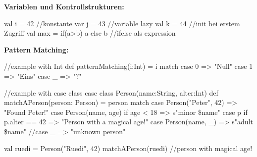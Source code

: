 \begin{breakbox}
\textbf{Variablen und Kontrollstrukturen:}\\
\begin{scalacode}
val i = 42 //konstante
var j = 43 //variable
lazy val k = 44 //init bei erstem Zugriff
val max = if(a>b) a else b //ifelse als expression
\end{scalacode}
\end{breakbox}

\begin{breakbox}
\textbf{Pattern Matching:}\\
\begin{scalacode}
//example with Int
def patternMatching(i:Int) = {
  i match {
    case 0 => "Null"
    case 1 => "Eins"
    case _ => "?"
  }
}

//example with case class
case class Person(name:String, alter:Int)
def matchAPerson(person: Person) = {
  person match {
    case Person("Peter", 42)           => "Found Peter!"
    case Person(name, age) if age < 18 => s"minor \$name"
    case p if p.alter == 42   => "Person with a magical age!"
    case Person(name, _)               => s"adult \$name"
    //case _                             => "unknown person"
  }
}

val ruedi = Person("Ruedi", 42)
matchAPerson(ruedi) //person with magical age!
\end{scalacode}
\end{breakbox}